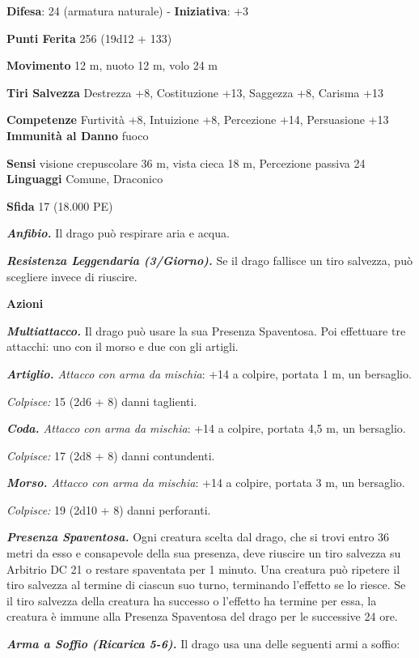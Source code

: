 \begin{multicols}{2}
\textbf{Difesa}: 24 (armatura naturale) - \textbf{Iniziativa}: +3

\textbf{Punti Ferita} 256 (19d12 + 133)

\textbf{Movimento} 12 m, nuoto 12 m, volo 24 m

\textbf{Tiri Salvezza} Destrezza +8, Costituzione +13, Saggezza +8,
Carisma +13

\textbf{Competenze} Furtività +8, Intuizione +8, Percezione +14,
Persuasione +13 \textbf{Immunità al Danno} fuoco

\textbf{Sensi} visione crepuscolare 36 m, vista cieca 18 m, Percezione passiva
24 \textbf{Linguaggi} Comune, Draconico

\textbf{Sfida} 17 (18.000 PE)\smallskip

\emph{\textbf{Anfibio.}} Il drago può respirare aria e acqua.

\emph{\textbf{Resistenza Leggendaria (3/Giorno).}} Se il drago fallisce
un tiro salvezza, può scegliere invece di riuscire.

\smallskip\textbf{Azioni}

\emph{\textbf{Multiattacco.}} Il drago può usare la sua Presenza
Spaventosa. Poi effettuare tre attacchi: uno con il morso e due con gli
artigli.

\emph{\textbf{Artiglio.} Attacco con arma da mischia}: +14 a colpire,
portata 1 m, un bersaglio.

\emph{Colpisce:} 15 (2d6 + 8) danni taglienti.

\emph{\textbf{Coda.} Attacco con arma da mischia}: +14 a colpire,
portata 4,5 m, un bersaglio.

\emph{Colpisce:} 17 (2d8 + 8) danni contundenti.

\emph{\textbf{Morso.} Attacco con arma da mischia}: +14 a colpire,
portata 3 m, un bersaglio.

\emph{Colpisce:} 19 (2d10 + 8) danni perforanti.

\emph{\textbf{Presenza Spaventosa.}} Ogni creatura scelta dal drago, che
si trovi entro 36 metri da esso e consapevole della sua presenza, deve
riuscire un tiro salvezza su Arbitrio DC 21 o restare spaventata per 1
minuto. Una creatura può ripetere il tiro salvezza al termine di ciascun
suo turno, terminando l'effetto se lo riesce. Se il tiro salvezza della
creatura ha successo o l'effetto ha termine per essa, la creatura è
immune alla Presenza Spaventosa del drago per le successive 24 ore.

\emph{\textbf{Arma a Soffio (Ricarica 5-6).}} Il drago usa una delle
seguenti armi a soffio:


\end{multicols}
